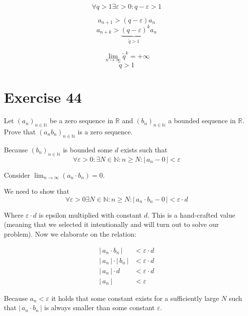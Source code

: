 \documentclass[a4paper]{article}
\theoremstyle{definition}
\newcommand\card[1]{\left|\,#1\,\right|}
\begin{document}
\[ \forall q > 1 \exists \varepsilon > 0: q - \varepsilon > 1 \]

\[ a_{n+1} > (q - \varepsilon) a_n \]
\[ a_{n+k} > {\underbrace{(q - \varepsilon)}_{\tilde q > 1}}^k a_n \]

\[ \lim_{n\to\infty} \tilde q^k = +\infty \]
\[ \tilde q > 1 \]

\section{Exercise 44}
\begin{ex}
  Let $(a_n)_{n \in \mathbb N}$ be a zero sequence in $\mathbb R$ and $(b_n)_{n \in \mathbb N}$ a bounded sequence in $\mathbb R$.
  Prove that $(a_n b_n)_{n \in \mathbb N}$ is a zero sequence.
\end{ex}

Because $(b_n)_{n \in \mathbb N}$ is bounded some $d$ exists such that
\[ \forall \varepsilon > 0: \exists N \in \mathbb N: n \geq N: \card{a_n - 0} < \varepsilon \]

Consider $\lim_{n\to\infty} (a_n \cdot b_n) = 0$.

We need to show that
\[ \forall \varepsilon > 0 \exists N \in \mathbb N: n \geq N: \card{a_n \cdot b_n - 0} < \varepsilon \cdot d \]

Where $\varepsilon \cdot d$ is epsilon multiplied with constant $d$.
This is a hand-crafted value (meaning that we selected it intentionally and will turn out to solve our problem). Now we elaborate on the relation:

\begin{align*}
  \card{a_n \cdot b_n} &< \varepsilon \cdot d \\
  \card{a_n} \cdot \card{b_n} &< \varepsilon \cdot d \\
  \card{a_n} \cdot d &< \varepsilon \cdot d \\
  \card{a_n} &< \varepsilon
\end{align*}

Because $a_n < \varepsilon$ it holds that some constant exists for a sufficiently large $N$ such that $\card{a_n \cdot b_n}$ is always smaller than some constant $\varepsilon$.
\end{document}
